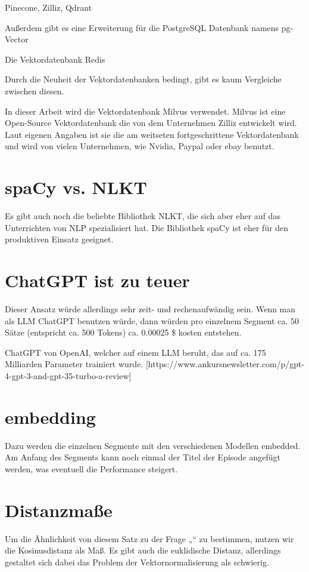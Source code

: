 Pinecone, Zilliz, Qdrant

Außerdem gibt es eine Erweiterung für die PostgreSQL Datenbank namens pg-Vector

Die Vektordatenbank Redis

Durch die Neuheit der Vektordatenbanken bedingt, gibt es kaum Vergleiche zwischen diesen.
\cite{blueteamai}


In dieser Arbeit wird die Vektordatenbank Milvus verwendet.
Milvus ist eine Open-Source Vektordatenbank die von dem Unternehmen Zilliz entwickelt wird.
Laut eigenen Angaben ist sie die am weitseten fortgeschrittene Vektordatenbank und wird von vielen Unternehmen, wie Nvidia, Paypal oder ebay benutzt.

\section{spaCy vs. NLKT}

Es gibt auch noch die beliebte Bibliothek NLKT, die sich aber eher auf das Unterrichten von NLP spezialisiert hat.
Die Bibliothek spaCy ist eher für den produktiven Einsatz geeignet.

\section{ChatGPT ist zu teuer}

Dieser Ansatz würde allerdings sehr zeit- und rechenaufwändig sein.
Wenn man als LLM ChatGPT benutzen würde, dann würden pro einzelnem Segment ca. 50 Sätze (entspricht ca. 500 Tokens) ca. 0.00025 \$ kosten entstehen.

ChatGPT von OpenAI, welcher auf einem LLM beruht, das auf ca. 175 Milliarden Parameter trainiert wurde. [https://www.ankursnewsletter.com/p/gpt-4-gpt-3-and-gpt-35-turbo-a-review]

\section{embedding}
Dazu werden die einzelnen Segmente mit den verschiedenen Modellen embedded.
Am Anfang des Segments kann noch einmal der Titel der Episode angefügt werden, was eventuell die Performance steigert.\cite{jones2021}

\section{Distanzmaße}

Um die Ähnlichkeit von diesem Satz zu der Frage „“ zu bestimmen, nutzen wir die Kosinusdistanz als Maß.
Es gibt auch die euklidische Distanz, allerdings gestaltet sich dabei das Problem der Vektornormalisierung als schwierig.

